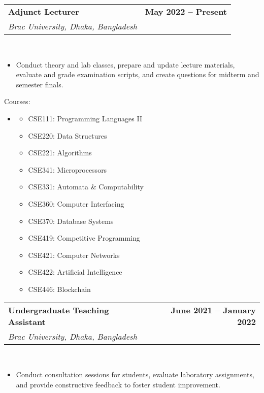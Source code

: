 \documentclass[letterpaper,10.5pt]{article}
\makeatletter
\newcommand{\resumeSubheading}[4]{
  \vspace{-2pt}\item
    \begin{tabular*}{1.0\textwidth}[t]{l@{\extracolsep{\fill}}r}
      \textbf{#1} & \textbf{\small #2} \\
      \textit{\small#3} & \textit{\small #4} \\
    \end{tabular*}\vspace{-7pt}
}
\newcommand{\resumeSubHeadingListStart}{\begin{itemize}[leftmargin=0.0in, label={}]}
\makeatother
\begin{document}
\resumeSubheading
{Adjunct Lecturer}{May 2022 -- Present}
{Brac University, Dhaka, Bangladesh}{}\\
\begin{itemize}[leftmargin=0.2in]
\item Conduct theory and lab classes, prepare and update lecture materials, evaluate and grade examination scripts, and create questions for midterm and semester finals. 
\end{itemize}
\vspace{-.1in}
\small{Courses:}
\vspace{-.18in}
\begin{itemize}[leftmargin=.5in]
  \item[\null]
    \begin{multicols}{3}
      \begin{itemize}[leftmargin=0.2in, itemsep=0pt, parsep=3pt]
        \setlength\itemsep{-3pt}
        \item\small CSE111: Programming Languages II
        \item CSE220: Data Structures
        \item CSE221: Algorithms
        \item CSE341: Microprocessors
        \item CSE331: Automata \& Computability
        \item CSE360: Computer Interfacing
        \item CSE370: Database Systems
        \item CSE419: Competitive Programming
        \item CSE421: Computer Networks
        \item CSE422: Artificial Intelligence
        \item CSE446: Blockchain

      \end{itemize}
    \end{multicols}
\end{itemize}
\vspace{-6pt}
\resumeSubheading
{Undergraduate Teaching Assistant}{June 2021 -- January 2022}
{Brac University, Dhaka, Bangladesh}{}\\
\begin{itemize}[leftmargin=0.2in]
\item Conduct consultation sessions for students, evaluate laboratory assignments, and provide constructive feedback to foster student improvement.
\end{itemize}
\end{document}
